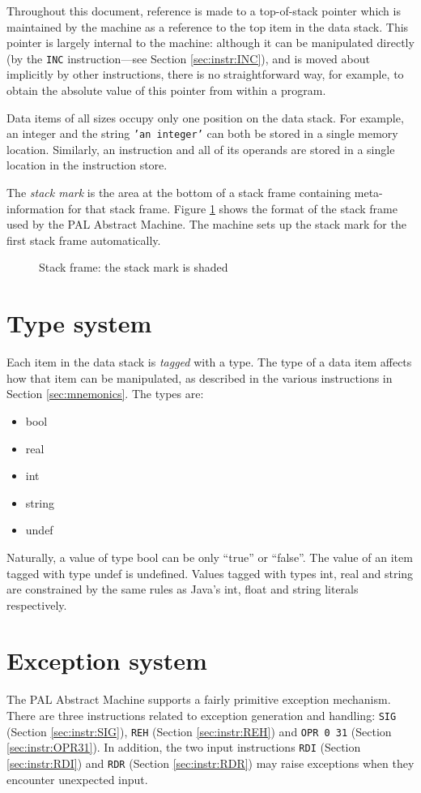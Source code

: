 \documentclass[a4paper,10pt]{report}
\begin{document}
Throughout this document, reference is made to a top-of-stack pointer
which is maintained by the machine as a reference to the top item in
the data stack.  This pointer is largely internal to the machine:
although it can be manipulated directly (by the \texttt{INC}
instruction---see Section \ref{sec:instr:INC}), and is moved about
implicitly by other instructions, there is no straightforward way, for
example, to obtain the absolute value of this pointer from within a
program.

Data items of all sizes occupy only one position on the data stack.
For example, an integer and the string \texttt{'an integer'} can both
be stored in a single memory location.  Similarly, an instruction and
all of its operands are stored in a single location in the instruction
store.

The \emph{stack mark} is the area at the bottom of a stack frame
containing meta-information for that stack frame.  Figure
\ref{fig:stack} shows the format of the stack frame used by the PAL
Abstract Machine.  The machine sets up the stack mark for the first
stack frame automatically.

\begin{figure}[htbp]
  \centering
  
  \centerline{\box\graph}
  \caption[Stack frame]{Stack frame: the stack mark is shaded}
  \label{fig:stack}
\end{figure}

\section{Type system}
Each item in the data stack is \emph{tagged} with a type.  The type of
a data item affects how that item can be manipulated, as described in
the various instructions in Section \ref{sec:mnemonics}.  The types
are:
\begin{itemize}
\item bool
\item real
\item int
\item string
\item undef
\end{itemize}
Naturally, a value of type bool can be only ``true'' or ``false''.
The value of an item tagged with type undef is undefined.  Values
tagged with types int, real and string are constrained by the same
rules as Java's int, float and string literals respectively.

\section{Exception system}
\label{sec:exceptions}
The PAL Abstract Machine supports a fairly primitive exception
mechanism.  There are three instructions related to exception
generation and handling: \texttt{SIG} (Section \ref{sec:instr:SIG}),
\texttt{REH} (Section \ref{sec:instr:REH}) and \texttt{OPR 0 31}
(Section \ref{sec:instr:OPR31}).  In addition, the two input
instructions \texttt{RDI} (Section \ref{sec:instr:RDI}) and
\texttt{RDR} (Section \ref{sec:instr:RDR}) may raise exceptions when
they encounter unexpected input.
\end{document}
